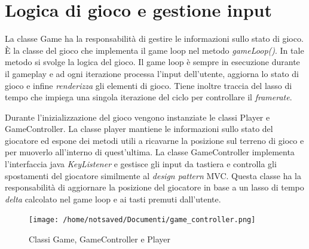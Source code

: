 \documentclass[12pt]{book}
\begin{document}
\section{Logica di gioco e gestione input}
\par{La classe Game ha la responsabilit\`a di gestire le informazioni sullo stato di gioco. \`E la classe del gioco che implementa il game loop nel metodo \emph{gameLoop()}. In tale metodo si svolge la logica del gioco. Il game loop \`e sempre in esecuzione durante il gameplay e ad ogni iterazione processa l'input dell'utente, aggiorna lo stato di gioco e infine \emph{renderizza} gli elementi di gioco. Tiene inoltre traccia del lasso di tempo che impiega una singola iterazione del ciclo per controllare il \emph{framerate}.}
\par{Durante l'inizializzazione del gioco vengono instanziate le classi Player e GameController. La classe player mantiene le informazioni sullo stato del giocatore ed espone dei metodi utili a ricavarne la posizione sul terreno di gioco e per muoverlo all'interno di quest'ultima. La classe GameController implementa l'interfaccia java \emph{KeyListener} e gestisce gli input da tastiera e controlla gli spostamenti del giocatore similmente al \emph{design pattern} MVC. Questa classe ha la responsabilit\`a di aggiornare la posizione del giocatore in base a un lasso di tempo \emph{delta} calcolato nel game loop e ai tasti premuti dall'utente.}

\begin{figure}[htp]
\centering
\texttt{[image: /home/notsaved/Documenti/game\_controller.png]}
\caption{Classi Game, GameController e Player}
\label{gamecontroller}
\end{figure}
\end{document}
